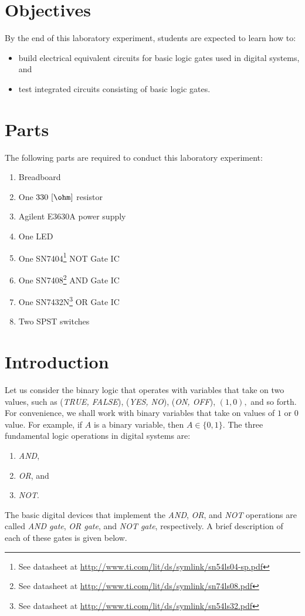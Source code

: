 
\section{Objectives}
By the end of this laboratory experiment, students are expected to learn how to:

\begin{itemize}

\item build electrical equivalent circuits for basic logic gates used in digital systems, and 
  
\item test integrated circuits consisting of basic logic gates. 
   
\end{itemize}

\section{Parts}
\label{sec:partsEx12}
The following parts are required to conduct this laboratory experiment: %
%
\begin{enumerate}           
\item Breadboard
\item One $330~[\ohm]$ resistor
\item Agilent E3630A power supply
\item One  LED
\item One SN7404\footnote{See datasheet at \url{http://www.ti.com/lit/ds/symlink/sn54ls04-sp.pdf}} NOT Gate IC
\item One SN7408\footnote{See datasheet at \url{http://www.ti.com/lit/ds/symlink/sn74ls08.pdf}}   AND Gate IC
\item One SN7432N\footnote{See datasheet at \url{http://www.ti.com/lit/ds/symlink/sn54ls32.pdf}}  OR Gate IC
  
\item Two SPST switches 
\end{enumerate}


\section{Introduction}
\label{sec:introduction}
Let us consider the binary logic that operates with variables that take on two values, such as (\emph{TRUE, FALSE}), (\emph{YES, NO}), (\emph{ON, OFF}), $(1,0),$ and so forth. For convenience, we shall work with binary variables that take on values of $1$ or $0$ value. For example, if $A$ is a binary variable, then $A\in\{0,1\}.$ The three fundamental logic operations in digital systems are: %
%
\begin{enumerate}
\item \emph{AND},
  
\item \emph{OR}, and
  
\item \emph{NOT}.
\end{enumerate}
%
The basic digital devices that implement the \emph{AND}, \emph{OR}, and \emph{NOT} operations are called \emph{AND gate}, \emph{OR gate}, and \emph{NOT gate}, respectively. A brief description of each of these gates is given below.

